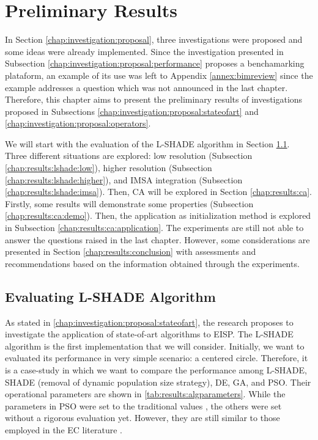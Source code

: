 
\chapter{Preliminary Results}\label{chap:results}

	In Section \ref{chap:investigation:proposal}, three investigations were proposed and some ideas were already implemented. Since the investigation presented in Subsection \ref{chap:investigation:proposal:performance} proposes a benchamarking plataform, an example of its use was left to Appendix \ref{annex:bimreview} since the example addresses a question which was not announced in the last chapter. Therefore, this chapter aims to present the preliminary results of investigations proposed in Subsections \ref{chap:investigation:proposal:stateofart} and \ref{chap:investigation:proposal:operators}.
	
	We will start with the evaluation of the L-SHADE algorithm in Section \ref{chap:results:lshade}. Three different situations are explored: low resolution (Subsection \ref{chap:results:lshade:low}), higher resolution (Subsection \ref{chap:results:lshade:higher}), and IMSA integration (Subsection \ref{chap:results:lshade:imsa}). Then, CA will be explored in Section \ref{chap:results:ca}. Firstly, some results will demonstrate some properties (Subsection \ref{chap:results:ca:demo}). Then, the application as initialization method is explored in Subsection \ref{chap:results:ca:application}. The experiments are still not able to answer the questions raised in the last chapter. However, some considerations are presented in Section \ref{chap:results:conclusion} with assessments and recommendations based on the information obtained through the experiments.

	\section{Evaluating L-SHADE Algorithm}\label{chap:results:lshade}

		As stated in \autoref{chap:investigation:proposal:stateofart}, the research proposes to investigate the application of state-of-art algorithms to EISP. The L-SHADE algorithm is the first implementation that we will consider. Initially, we want to evaluated its performance in very simple scenario: a centered circle. Therefore, it is a case-study in which we want to compare the performance among L-SHADE, SHADE (removal of dynamic population size strategy), DE, GA, and PSO. Their operational parameters are shown in \autoref{tab:results:algparameters}. While the parameters in PSO were set to the traditional values \citep{salucci2017multifrequency}, the others were set without a rigorous evaluation yet. However, they are still similar to those employed in the EC literature \cite{eiben2015introduction}.
		
